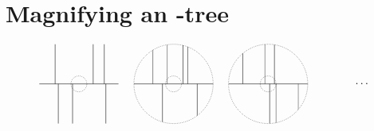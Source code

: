 

\section*{Magnifying an \texorpdfstring{\R}{R}-tree}


\begin{equation*}
	\begin{tikzpicture}[scale=0.5]

		\begin{scope}
			\draw (0,0) -- (5,0);
			\draw (1.0,0) -- (1.0,2.5);
			\draw (1.2,0) -- (1.2,-2.5);
			\draw (2.1,0) -- (2.1,-2.5);
			\draw (3.4,0) -- (3.4,2.5);
			\draw (4.1,0) -- (4.1,2.5);
			\draw (4.2,0) -- (4.2,-2.5);
			\coordinate (c0) at (2.5,0);
			\draw[densely dotted] (c0) circle (0.5);
		\end{scope}

		\begin{scope}[xshift=170]
			\coordinate (c1) at (2.5,0);
			\draw[densely dotted] (c1) circle (2.5);
			\begin{scope}
				\clip (c1) circle (2.5);
				\draw (0,0) -- (5,0);
				\draw (1.2,0) -- (1.2,2.5);
				\draw (4.0,0) -- (4.0,-2.5);
				\draw (1.8,0) -- (1.8,-2.5);
				\draw (3.4,0) -- (3.4,2.5);
				\draw (3.1,0) -- (3.1,2.5);
				\draw (2.1,0) -- (2.1,2.5);
				\draw[densely dotted] (2.5,0) circle (0.5);
			\end{scope}
		\end{scope}

		\begin{scope}[xshift=340]
			\coordinate (c2) at (2.5,0);
			\draw[densely dotted] (c2) circle (2.5);
			\begin{scope}
				\clip (c2) circle (2.5);
				\draw (0,0) -- (5,0);
				\draw (0.9,0) -- (0.9,2.5);
				\draw (4.4,0) -- (4.4,-2.5);
				\draw (3.0,0) -- (3.0,-2.5);
				\draw (2.3,0) -- (2.3,2.5);
				\draw (2.9,0) -- (2.9,2.5);
				\draw (2.6,0) -- (2.6,-2.5);
				\draw[densely dotted] (2.5,0) circle (0.5);
			\end{scope}
		\end{scope}

		\begin{scope}[xshift=510]
			\coordinate (c3) at (2.5,0);
			\node at (2.5,0) {$\cdots$};
		\end{scope}


\end{tikzpicture}
\end{equation*}
